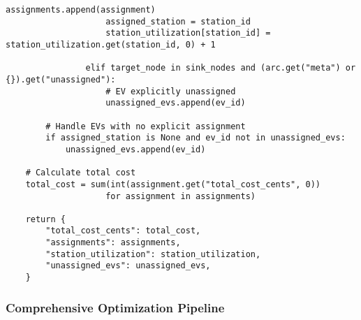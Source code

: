 \documentclass[12pt,a4paper]{article}
\begin{document}
\begin{lstlisting}[caption=Solution Analysis and Assignment Extraction]
                    assignments.append(assignment)
                    assigned_station = station_id
                    station_utilization[station_id] = station_utilization.get(station_id, 0) + 1
                
                elif target_node in sink_nodes and (arc.get("meta") or {}).get("unassigned"):
                    # EV explicitly unassigned
                    unassigned_evs.append(ev_id)
        
        # Handle EVs with no explicit assignment
        if assigned_station is None and ev_id not in unassigned_evs:
            unassigned_evs.append(ev_id)
    
    # Calculate total cost
    total_cost = sum(int(assignment.get("total_cost_cents", 0)) 
                    for assignment in assignments)
    
    return {
        "total_cost_cents": total_cost,
        "assignments": assignments,
        "station_utilization": station_utilization,
        "unassigned_evs": unassigned_evs,
    }
\end{lstlisting}

\subsubsection{Comprehensive Optimization Pipeline}
\end{document}
